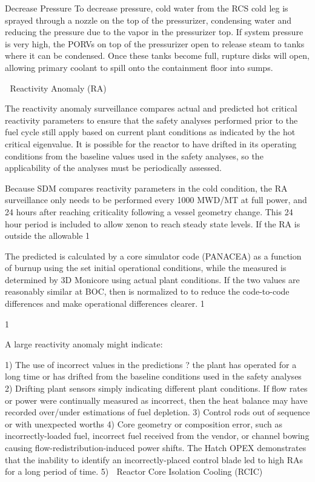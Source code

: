 \documentclass[10pt]{article}
\begin{document}
Decrease Pressure
To decrease pressure, cold water from the RCS cold leg is sprayed through a nozzle on the top of the pressurizer, condensing water and reducing the pressure due to the vapor in the pressurizer top. If system pressure is very high, the PORVs on top of the pressurizer open to release steam to tanks where it can be condensed. Once these tanks become full, rupture disks will open, allowing primary coolant to spill onto the containment floor into sumps. 


Reactivity Anomaly (RA)

The reactivity anomaly surveillance compares actual and predicted hot critical reactivity parameters to ensure that the safety analyses performed prior to the fuel cycle still apply based on current plant conditions as indicated by the hot critical eigenvalue. It is possible for the reactor to have drifted in its operating conditions from the baseline values used in the safety analyses, so the applicability of the analyses must be periodically assessed. 

Because SDM compares reactivity parameters in the cold condition, the RA surveillance only needs to be performed every 1000 MWD/MT at full power, and 24 hours after reaching criticality following a vessel geometry change. This 24 hour period is included to allow xenon to reach steady state levels. If the RA is outside the allowable  1%

The predicted  is calculated by a core simulator code (PANACEA) as a function of burnup using the set initial operational conditions, while the measured  is determined by 3D Monicore using actual plant conditions. If the two values are reasonably similar at BOC, then is normalized to  to reduce the code-to-code differences and make operational differences clearer.
  1%

  1%

A large reactivity anomaly might indicate:

1)	The use of incorrect values in the predictions ? the plant has operated for a long time or has drifted from the baseline conditions used in the safety analyses
2)	Drifting plant sensors simply indicating different plant conditions. If flow rates or power were continually measured as incorrect, then the heat balance may have recorded over/under estimations of fuel depletion. 
3)	Control rods out of sequence or with unexpected worths
4)	Core geometry or composition error, such as incorrectly-loaded fuel, incorrect fuel received from the vendor, or channel bowing causing flow-redistribution-induced power shifts. The Hatch OPEX demonstrates that the inability to identify an incorrectly-placed control blade led to high RAs for a long period of time. 
5)	
Reactor Core Isolation Cooling (RCIC)
\end{document}
